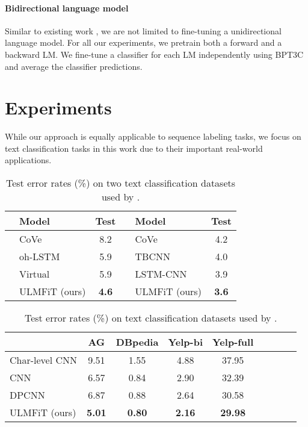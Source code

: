 \documentclass[11pt,a4paper]{article}
\begin{document}
\paragraph{Bidirectional language model} Similar to existing work \cite{peters2017semi,deepcontext2017}, we are not limited to fine-tuning a unidirectional language model. For all our experiments, we pretrain both a forward and a backward LM. We fine-tune a classifier for each LM independently using BPT3C and average the classifier predictions.

\section{Experiments} \label{sec:experiments}

While our approach is equally applicable to sequence labeling tasks, we focus on text classification tasks in this work due to their important real-world applications.

\begin{table*}
  \centering
  \setlength\tabcolsep{3.65pt}
\begin{tabular}{llcllc}
    \toprule
 & Model & Test &  & Model & Test\\
\midrule
 \parbox[t]{2mm}{} & CoVe \cite{Mccann2017} & 8.2 & \parbox[t]{2mm}{} & CoVe \cite{Mccann2017} & 4.2 \\
 & oh-LSTM~\cite{johnson2016supervised} & 5.9 & & TBCNN~\cite{mou2015discriminative}& 4.0 \\
 & Virtual~\cite{miyato2016adversarial} & 5.9 & & LSTM-CNN~\cite{zhou2016text} & 3.9 \\
 & ULMFiT (ours) & \textbf{4.6} & & ULMFiT (ours) & \textbf{3.6} \\
\bottomrule
  \end{tabular}
      \caption{Test error rates (\%) on two text classification datasets used by .}
  \label{tab:results-mccann}
\end{table*}

\begin{table*}
\centering
\begin{tabular}{l c c c c c c c c}
\toprule
 & AG & DBpedia & Yelp-bi & Yelp-full \\
 \midrule
Char-level CNN \cite{zhang2015character} & 9.51 & 1.55 & 4.88 & 37.95 \\
CNN \cite{johnson2016supervised} & 6.57 & 0.84 & 2.90 & 32.39 \\
DPCNN \cite{johnson2017deep} & 6.87 & 0.88 & 2.64 & 30.58 \\
ULMFiT (ours) & \textbf{5.01} & \textbf{0.80} & \textbf{2.16} & \textbf{29.98} & \\
\bottomrule
\end{tabular}
\caption{Test error rates (\%) on text classification datasets used by .}
\label{tab:results-zhang}
\end{table*}
\end{document}
